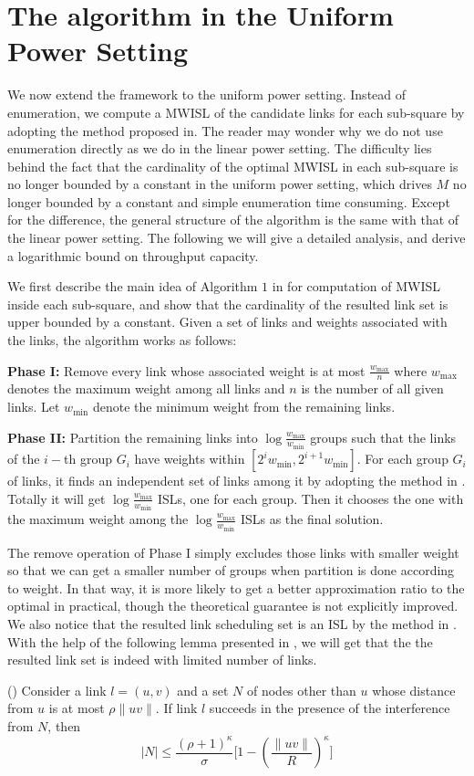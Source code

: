 \documentclass[journal]{IEEEtran}
\begin{document}
\section{The algorithm in the Uniform Power Setting}
We now extend the framework to the uniform power setting.
Instead of enumeration, we compute a MWISL of the candidate links for each sub-square by adopting the method
proposed in\cite{S:phy9}. The reader may wonder why we do not use enumeration directly as we do in the linear power setting. The difficulty lies behind the fact that the cardinality of the optimal MWISL in each sub-square is no longer bounded by a constant in the uniform power setting, which drives $M$ no longer bounded by a constant and  simple enumeration time consuming.
Except for the difference, the general structure of the algorithm is the same with that of the linear power setting. The following we will give a detailed analysis, and derive a logarithmic bound on throughput capacity.

We first describe the main idea of Algorithm $1$ in \cite{S:phy9} for computation of MWISL inside each sub-square, and show that the cardinality of the resulted link set is upper bounded by a constant. Given a set of links and weights associated with the links, the algorithm works as follows:

\textbf{Phase I:} Remove every link whose associated weight is at most $\frac{w_{\max}}{n}$ where $w_{\max}$ denotes the maximum weight among all links and $n$ is the number of all given links. Let $w_{\min}$ denote the minimum weight from the remaining links.

\textbf{Phase II:}  Partition the remaining links into $\log{\frac{w_{\max}}{w_{\min}}}$ groups such that  the links of the $i-$th group $G_i$ have weights within $[2^i w_{\min}, 2^{i+1} w_{\min}]$. For each group $G_i$ of links, it finds an independent set of links among it by adopting the method in \cite{S:phy4}. Totally it will get $\log{\frac{w_{\max}}{w_{\min}}}$  ISLs, one for each group.
Then it chooses the one with the maximum weight among the $\log{\frac{w_{\max}}{w_{\min}}}$ ISLs as the final solution.

The remove operation of Phase I simply excludes those links with smaller weight so that we can get a smaller number of groups when partition is done according to weight. In that way, it is more likely to get a better approximation ratio to the optimal in practical, though the theoretical guarantee is not explicitly improved. We also notice that the resulted link scheduling  set is an ISL by the method in \cite{S:phy4}.  With the help of the following lemma presented in \cite{S:phy4}, we will get that the the resulted link set is indeed with limited number of links.
\begin{lemma}(\cite{S:phy4})
Consider a link $l=(u,v)$ and a set $N$ of nodes other than $u$ whose distance from $u$ is at most $\rho\|uv\|$. If link $l$ succeeds in the presence of the interference from $N$, then
\[
    |N| \le \frac{(\rho+1)^{\kappa}}{\sigma} \biggl[1 - (\frac{\|uv\|}{R})^{\kappa} \biggl]
\]
\end{lemma}
\end{document}
